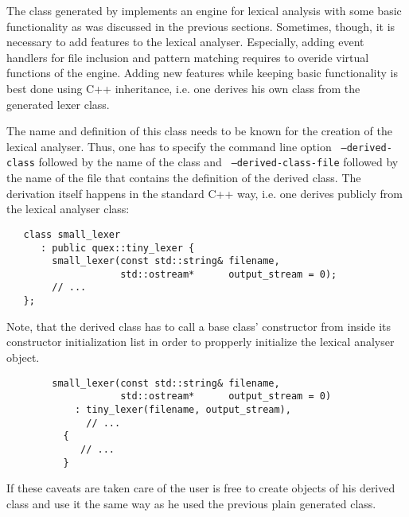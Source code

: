 The class generated by {\quex} implements an engine for lexical analysis with
some basic functionality as was discussed in the previous sections. Sometimes,
though, it is necessary to add features to the lexical analyser. Especially,
adding event handlers for file inclusion and pattern matching requires to
overide virtual functions of the engine. Adding new features while keeping
basic functionality is best done using C++ inheritance, i.e. one derives his
own class from the generated lexer class. 

The name and definition of this class needs to be known for the creation of
the lexical analyser. Thus, one has to specify the command line option {\tt
  --derived-class} followed by the name of the class and {\tt
  --derived-class-file} followed by the name of the file that contains the
definition of the derived class. The derivation itself happens in the standard
C++ way, i.e. one derives publicly from the lexical analyser class:

\begin{lstlisting}
   class small_lexer 
      : public quex::tiny_lexer {
        small_lexer(const std::string& filename,
                    std::ostream*      output_stream = 0);
        // ...
   };
\end{lstlisting}

Note, that the derived class has to call a base class' constructor from
inside its constructor initialization list in order to propperly initialize
the lexical analyser object.

\begin{lstlisting}
        small_lexer(const std::string& filename,
                    std::ostream*      output_stream = 0)
            : tiny_lexer(filename, output_stream),
              // ...
          {
             // ...
          }
\end{lstlisting}

If these caveats are taken care of the user is free to create objects of his
derived class and use it the same way as he used the previous plain generated
class.

